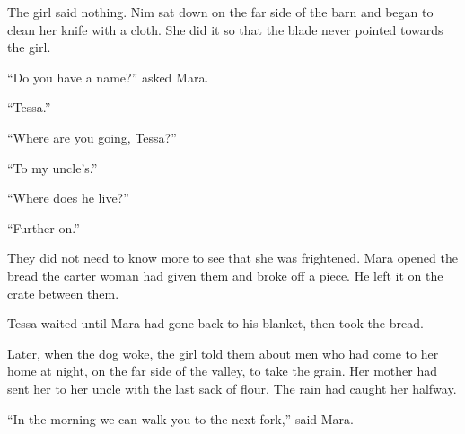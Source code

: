 \documentclass[10pt,a4paper]{article}
\begin{document}
The girl said nothing. Nim sat down on the far side of the barn and began to clean her knife with a cloth. She did it so that the blade never pointed towards the girl.

“Do you have a name?” asked Mara.

“Tessa.”

“Where are you going, Tessa?”

“To my uncle's.”

“Where does he live?”

“Further on.”

They did not need to know more to see that she was frightened. Mara opened the bread the carter woman had given them and broke off a piece. He left it on the crate between them.

Tessa waited until Mara had gone back to his blanket, then took the bread.

Later, when the dog woke, the girl told them about men who had come to her home at night, on the far side of the valley, to take the grain. Her mother had sent her to her uncle with the last sack of flour. The rain had caught her halfway.

“In the morning we can walk you to the next fork,” said Mara.
\end{document}
